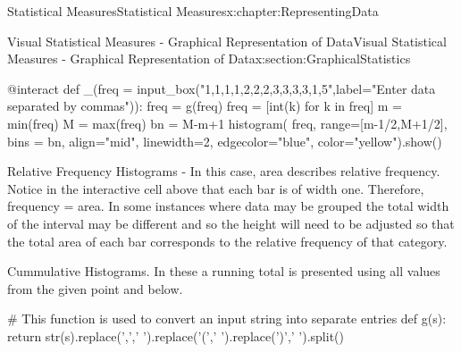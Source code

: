 \documentclass[oneside,10pt,]{book}
\numberwithin{equation}{section}
\begin{document}
\begin{chapterptx}{Statistical Measures}{}{Statistical Measures}{}{}{x:chapter:RepresentingData}
\begin{sectionptx}{Visual Statistical Measures - Graphical Representation of Data}{}{Visual Statistical Measures - Graphical Representation of Data}{}{}{x:section:GraphicalStatistics}
\begin{sageinput}
@interact
def _(freq = input_box("1,1,1,1,2,2,2,3,3,3,3,1,5",label="Enter data separated by commas")):
    freq = g(freq)
    freq = [int(k) for k in freq]
    m = min(freq)
    M = max(freq)
    bn = M-m+1
    histogram( freq, range=[m-1/2,M+1/2], bins = bn, align="mid", linewidth=2, edgecolor="blue", color="yellow").show()
\end{sageinput}
%
\par
Relative Frequency Histograms - In this case, area describes relative frequency.  Notice in the interactive cell above that each bar is of width one. Therefore, frequency = area. In some instances where data may be grouped the total width of the interval may be different and so the height will need to be adjusted so that the total area of each bar corresponds to the relative frequency of that category.%
\par
Cummulative Histograms.  In these a running total is presented using all values from the given point and below.%
\begin{sageinput}
#  This function is used to convert an input string into separate entries
def g(s): return str(s).replace(',',' ').replace('(',' ').replace(')',' ').split()


\end{sageinput}
\end{sectionptx}
\end{chapterptx}
\end{document}
